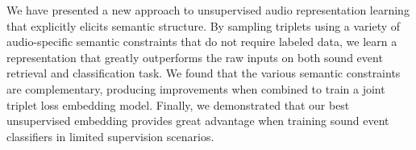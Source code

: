 \documentclass{article}
\begin{document}
We have presented a new approach to unsupervised audio representation learning
that explicitly elicits semantic structure.  By sampling triplets using a
variety of audio-specific semantic constraints that do not require labeled data,
we learn a representation that greatly outperforms the raw inputs on both sound
event retrieval and classification task.  We found that the various semantic
constraints are complementary, producing improvements when combined to train a
joint triplet loss embedding model.  Finally, we demonstrated that our best
unsupervised embedding provides great advantage when training sound event
classifiers in limited supervision scenarios.

\clearpage


\end{document}
